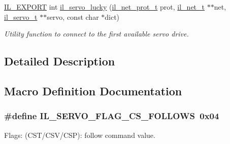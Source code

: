 \begin{DoxyCompactItemize}
\hyperlink{common_8h_a6bb629d26c52bfe10519ba3176853f47}{I\+L\+\_\+\+E\+X\+P\+O\+RT} int \hyperlink{group__IL__SERVO_gab5a21816ac7d663f8148feb12dd32f9a}{il\+\_\+servo\+\_\+lucky} (\hyperlink{group__IL__NET_ga9629f7451843e493e7665754b5c2feca}{il\+\_\+net\+\_\+prot\+\_\+t} prot, \hyperlink{group__IL__NET_ga0657204ab779a5b7a504aa0b895d1ae6}{il\+\_\+net\+\_\+t} $\ast$$\ast$net, \hyperlink{group__IL__SERVO_ga3369ddfcc33492fe3a28f96cf455b13e}{il\+\_\+servo\+\_\+t} $\ast$$\ast$servo, const char $\ast$dict)
\begin{DoxyCompactList}\small\item\em Utility function to connect to the first available servo drive. \end{DoxyCompactList}\end{DoxyCompactItemize}


\subsection{Detailed Description}


\subsection{Macro Definition Documentation}
\subsubsection[{\texorpdfstring{I\+L\+\_\+\+S\+E\+R\+V\+O\+\_\+\+F\+L\+A\+G\+\_\+\+C\+S\+\_\+\+F\+O\+L\+L\+O\+WS}{IL_SERVO_FLAG_CS_FOLLOWS}}]{\setlength{\rightskip}{0pt plus 5cm}\#define I\+L\+\_\+\+S\+E\+R\+V\+O\+\_\+\+F\+L\+A\+G\+\_\+\+C\+S\+\_\+\+F\+O\+L\+L\+O\+WS~0x04}\hypertarget{group__IL__SERVO_gad862ccc1fcb5ee2969898185b2e8e10c}{}\label{group__IL__SERVO_gad862ccc1fcb5ee2969898185b2e8e10c}


Flags\+: (C\+S\+T/\+C\+S\+V/\+C\+SP)\+: follow command value. 

